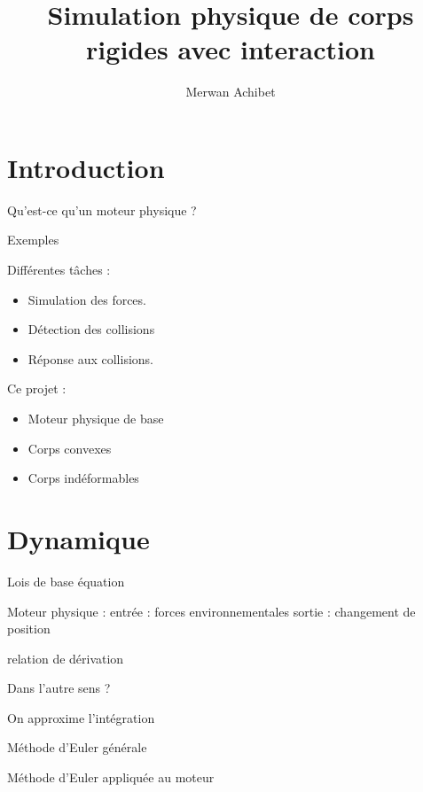 \documentclass{beamer}
\title{Simulation physique de corps rigides avec interaction}
\author{Merwan Achibet}
\date{}
\begin{document}
\begin{frame}
  \maketitle
\end{frame}

\section{Introduction}

\begin{frame}
  Qu'est-ce qu'un moteur physique ?

  Exemples
\end{frame}

\begin{frame}
  Différentes tâches :
  \begin{itemize}
    \item Simulation des forces.
    \item Détection des collisions
    \item Réponse aux collisions.
    \end{itemize}
\end{frame}

\begin{frame}
  Ce projet :
  \begin{itemize}
    \item Moteur physique de base
    \item Corps convexes
    \item Corps indéformables
  \end{itemize}
\end{frame}

\section{Dynamique}

\begin{frame}
  Lois de base
  équation

  Moteur physique :
  entrée : forces environnementales
  sortie : changement de position

  relation de dérivation

  Dans l'autre sens ?
\end{frame}

\begin{frame}
  On approxime l'intégration

  Méthode d'Euler générale

  Méthode d'Euler appliquée au moteur
\end{frame}
\end{document}
